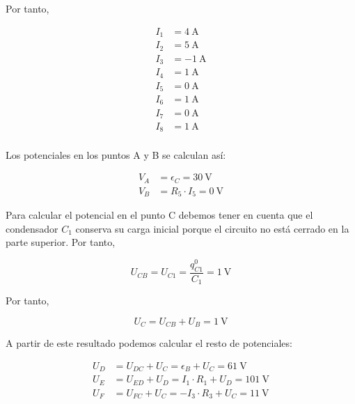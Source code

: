 Por tanto,

\begin{align*}
  I_1 &= \qty{4}{\ampere}\\
  I_2 &= \qty{5}{\ampere}\\
  I_3 &= \qty{-1}{\ampere}\\
  I_4 &= \qty{1}{\ampere}\\
  I_5 &= \qty{0}{\ampere}\\
  I_6 &= \qty{1}{\ampere}\\
  I_7 &= \qty{0}{\ampere}\\
  I_8 &= \qty{1}{\ampere}\\
\end{align*}

Los potenciales en los puntos A y B se calculan así:

\begin{align*}
  V_A &= \epsilon_C = \qty{30}{\volt}\\
  V_B &= R_5 \cdot I_5 = \qty{0}{\volt}
\end{align*}

Para calcular el potencial en el punto C debemos tener en cuenta que el condensador $C_1$ conserva su carga inicial porque el circuito no está cerrado en la parte superior. Por tanto,

\begin{equation*}
  U_{CB} = U_{C1} = \frac{q^0_{C1} }{C_1} = \qty{1}{\volt}
\end{equation*}

Por tanto,

\begin{equation*}
  U_C = U_{CB} + U_B = \qty{1}{\volt}
\end{equation*}

A partir de este resultado podemos calcular el resto de potenciales:

\begin{align*}
  U_D &= U_{DC} + U_C = \epsilon_B + U_C = \qty{61}{\volt}\\
  U_E &= U_{ED} + U_D = I_1 \cdot R_1 + U_D = \qty{101}{\volt}\\
  U_F &= U_{FC} + U_C = -I_3 \cdot R_3 + U_C = \qty{11}{\volt}
\end{align*}

